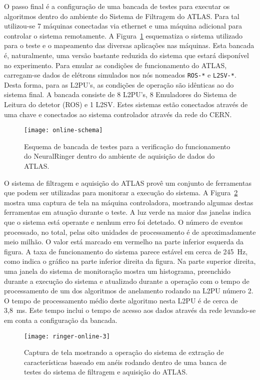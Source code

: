 O passo final é a configuração de uma bancada de testes para executar os
algoritmos dentro do ambiente do Sistema de Filtragem do ATLAS. Para tal
utilizou-se 7 máquinas conectadas via  ethernet e uma máquina
adicional para controlar o sistema remotamente.  A
Figura~\ref{fig:online-schema} esquematiza o sistema utilizado para o teste e
o mapeamento das diversas aplicações nas máquinas. Esta bancada é,
naturalmente, uma versão bastante reduzida do sistema que estará disponível no
experimento. Para emular as condições de funcionamento do ATLAS, carregam-se
dados de elétrons simulados nos nós nomeados \texttt{ROS-*} e
\texttt{L2SV-*}. Desta forma, para as L2PU's, as condições de operação são
idênticas ao do sistema final. A bancada consiste de 8 L2PU's, 8 Emuladores do
Sistema de Leitura do detetor (ROS) e 1 L2SV. Estes sistemas estão conectados
através de uma chave  e conectados ao sistema
controlador através da rede do CERN.

\begin{figure}
\begin{center}
\texttt{[image: online-schema]}
\end{center}
\caption{Esquema de bancada de testes para a verificação do funcionamento do
NeuralRinger dentro do ambiente de aquisição de dados do ATLAS.}
\label{fig:online-schema}
\end{figure}

O sistema de filtragem e aquisição do ATLAS provê um conjunto de ferramentas
que podem ser utilizadas para monitorar a execução do sistema. A
Figura~\ref{fig:ringer-screenshot} mostra uma captura de tela na máquina
controladora, mostrando algumas destas ferramentas em atuação durante o
teste. A luz verde na maior das janelas indica que o sistema está operante e
nenhum erro foi detetado. O número de eventos processado, no total, pelas oito
unidades de processamento é de aproximadamente meio milhão. O valor está
marcado em vermelho na parte inferior esquerda da figura. A taxa de
funcionamento do sistema parece estável em cerca de 245~Hz, como indica o
gráfico na parte inferior direita da figura. Na parte superior direita, uma
janela do sistema de monitoração  mostra um histograma, preenchido
durante a execução do sistema e atualizado durante a operação com o tempo de
processamento de um dos algoritmos de anelamento rodando na L2PU número 2. O
tempo de processamento médio deste algoritmo nesta L2PU é de cerca de
3,8~ms. Este tempo inclui o tempo de acesso aos dados através da rede
 levando-se em conta a configuração da bancada.

\begin{figure}
\begin{center}
\texttt{[image: ringer-online-3]}
\end{center}
\caption{Captura de tela mostrando a operação do sistema de extração de
características baseado em anéis rodando dentro de uma banca de testes do
sistema de filtragem e aquisição do ATLAS.}
\label{fig:ringer-screenshot}
\end{figure}

